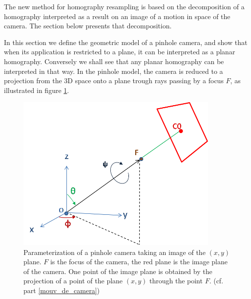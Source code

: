 The new method for homography resampling is based on the decomposition of a homography interpreted as a result on an image of a motion in space of the camera. The section below presents that decomposition.



\label{mouv_de_camera}

In this section we define the geometric model of a pinhole camera, and show that when its application is restricted to a plane, it can be interpreted as a planar homography. Conversely we shall see that any planar homography can be interpreted in that way. In the pinhole model, the camera is reduced to a projection from the 3D space  onto a plane trough rays passing by a focus $F$,  as illustrated in figure \ref{shmdecomp}.



\begin{figure}[h!]

\centering
\includegraphics[width=10cm]{shema_decomp.png}
\caption{Parameterization of a pinhole camera taking an image of the $(x,y)$ plane. $F$ is the focus of the camera, the red plane is the image plane of the camera.  One point of the image plane is obtained by the projection of a point of the plane $(x,y)$ through the point $F$. (cf. part \ref{mouv_de_camera})}
\label{shmdecomp}
\end{figure}


